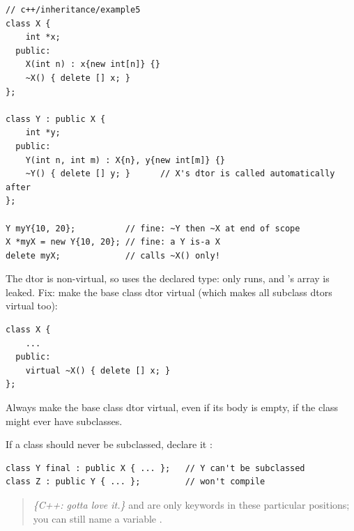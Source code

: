 \begin{lstlisting}[style=cpp]
// c++/inheritance/example5
class X {
    int *x;
  public:
    X(int n) : x{new int[n]} {}
    ~X() { delete [] x; }
};

class Y : public X {
    int *y;
  public:
    Y(int n, int m) : X{n}, y{new int[m]} {}
    ~Y() { delete [] y; }      // X's dtor is called automatically after
};

Y myY{10, 20};          // fine: ~Y then ~X at end of scope
X *myX = new Y{10, 20}; // fine: a Y is-a X
delete myX;             // calls ~X() only!
\end{lstlisting}
The dtor is non-virtual, so  uses the declared type: only
 runs, and 's array is leaked. Fix: make the base
class dtor virtual (which makes all subclass dtors virtual too):
\begin{center}
\end{center}
\begin{lstlisting}[style=cpp]
class X {
    ...
  public:
    virtual ~X() { delete [] x; }
};
\end{lstlisting}

\begin{important}[Rule]
Always make the base class dtor virtual, even if its body is empty, if the
class might ever have subclasses.
\end{important}

If a class should never be subclassed, declare it :
\begin{lstlisting}[style=cpp]
class Y final : public X { ... };   // Y can't be subclassed
class Z : public Y { ... };         // won't compile
\end{lstlisting}
\begin{quote}
\textit{\{C++: gotta love it.\}}  and  are only
keywords in these particular positions; you can still name a variable
.
\end{quote}

